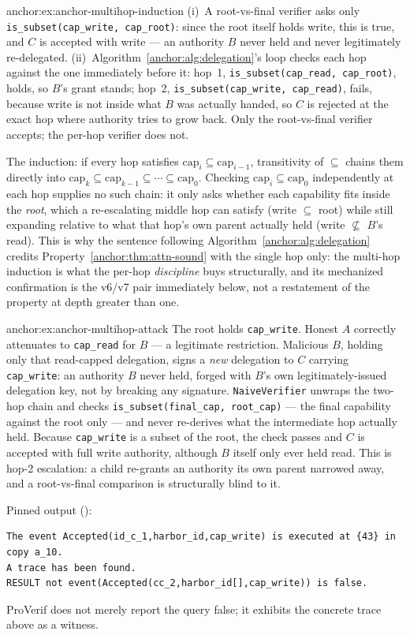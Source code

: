 \begin{pdSolution}{anchor:ex:anchor-multihop-induction}
(i)~A root-vs-final verifier asks only \texttt{is\_subset(cap\_write, cap\_root)}: since the root itself holds write, this is true, and $C$ is accepted with write --- an authority $B$ never held and never legitimately re-delegated. (ii)~Algorithm~\ref{anchor:alg:delegation}'s loop checks each hop against the one immediately before it: hop~1, \texttt{is\_subset(cap\_read, cap\_root)}, holds, so $B$'s grant stands; hop~2, \texttt{is\_subset(cap\_write, cap\_read)}, fails, because write is not inside what $B$ was actually handed, so $C$ is rejected at the exact hop where authority tries to grow back. Only the root-vs-final verifier accepts; the per-hop verifier does not.

The induction: if every hop satisfies $\mathrm{cap}_i \subseteq \mathrm{cap}_{i-1}$, transitivity of $\subseteq$ chains them directly into $\mathrm{cap}_k \subseteq \mathrm{cap}_{k-1} \subseteq \cdots \subseteq \mathrm{cap}_0$. Checking $\mathrm{cap}_i \subseteq \mathrm{cap}_0$ independently at each hop supplies no such chain: it only asks whether each capability fits inside the \emph{root}, which a re-escalating middle hop can satisfy (write $\subseteq$ root) while still expanding relative to what that hop's own parent actually held (write $\not\subseteq$ $B$'s read). This is why the sentence following Algorithm~\ref{anchor:alg:delegation} credits Property~\ref{anchor:thm:attn-sound} with the single hop only: the multi-hop induction is what the per-hop \emph{discipline} buys structurally, and its mechanized confirmation is the v6/v7 pair immediately below, not a restatement of the property at depth greater than one.
\end{pdSolution}
\begin{pdSolution}{anchor:ex:anchor-multihop-attack}
The root holds \texttt{cap\_write}. Honest $A$ correctly attenuates to \texttt{cap\_read} for $B$ --- a legitimate restriction. Malicious $B$, holding only that read-capped delegation, signs a \emph{new} delegation to $C$ carrying \texttt{cap\_write}: an authority $B$ never held, forged with $B$'s own legitimately-issued delegation key, not by breaking any signature. \texttt{NaiveVerifier} unwraps the two-hop chain and checks \texttt{is\_subset(final\_cap, root\_cap)} --- the final capability against the root only --- and never re-derives what the intermediate hop actually held. Because \texttt{cap\_write} is a subset of the root, the check passes and $C$ is accepted with full write authority, although $B$ itself only ever held read. This is hop-2 escalation: a child re-grants an authority its own parent narrowed away, and a root-vs-final comparison is structurally blind to it.

Pinned output ():
\begin{lstlisting}
The event Accepted(id_c_1,harbor_id,cap_write) is executed at {43} in copy a_10.
A trace has been found.
RESULT not event(Accepted(cc_2,harbor_id[],cap_write)) is false.
\end{lstlisting}
ProVerif does not merely report the query false; it exhibits the concrete trace above as a witness.
\end{pdSolution}
